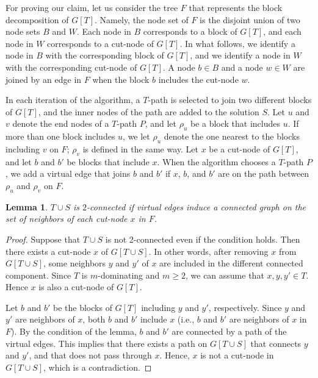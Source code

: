 \documentclass[11pt]{article}
\newtheorem{lemma}{Lemma}
\begin{document}
 For proving our claim, 
  let us consider the tree $F$ that represents the block
  decomposition of $G[T]$.
  Namely, the node set of $F$ is the disjoint union of two node sets $B$
  and $W$. Each node in $B$ corresponds to a block of
  $G[T]$,
  and each node in $W$ corresponds to a cut-node of $G[T]$.
  In what follows, we identify a node in $B$ with the corresponding
  block of $G[T]$, and we identify a node in $W$ with the
  corresponding
  cut-node of $G[T]$.
  A node $b \in B$ and a node $w \in W$ are joined by an edge in $F$
  when the block $b$ includes the cut-node $w$.

  In each iteration of the algorithm, a $T$-path is selected to
  join two different blocks of $G[T]$,
  and the inner nodes of the path are
  added to the solution $S$.
  Let $u$ and $v$ denote the end nodes of a $T$-path $P$, and 
  let $\rho_u$ be a block that includes $u$.
  If more than one block includes $u$, we let $\rho_u$
  denote the one nearest to the blocks including $v$ on $F$;
  $\rho_v$ is defined in the same way.
  Let $x$ be a cut-node of $G[T]$,
  and let $b$ and $b'$ be blocks that include $x$.
  When the algorithm chooses a $T$-path $P$,
  we add a virtual edge 
  that joins
  $b$ and $b'$ 
  if $x$, $b$, and $b'$ are on the path between
  $\rho_u$ and $\rho_v$ on $F$.
  
  \begin{lemma}
   $T\cup S$ is $2$-connected if
   virtual edges induce a connected graph
   on the set of neighbors of
    each cut-node $x$ in $F$.
  \end{lemma}
  \begin{proof}
   Suppose that $T\cup S$ is not 2-connected even if the condition holds. Then there 
   exists a cut-node $x$ of $G[T\cup S]$.
   In other words, after removing $x$ from $G[T\cup S]$, some neighbors $y$ and $y'$ of $x$
   are included in the different connected component.
   Since $T$ is $m$-dominating and $m \geq 2$, we can assume that $x,y,y' \in T$.
   Hence $x$ is also a cut-node of $G[T]$.
      
   Let $b$ and $b'$ be the blocks of $G[T]$ including $y$ and $y'$, respectively. 
   Since $y$ and $y'$ are neighbors of $x$, both $b$ and $b'$ include $x$ (i.e., 
   $b$ and $b'$ are neighbors of $x$ in $F$).
   By the condition of the lemma,
   $b$ and $b'$ are connected by a path of the virtual edges. 
   This implies that there exists a path on $G[T\cup S]$ that connects $y$ and $y'$,
   and that does not pass through $x$.
   Hence, $x$ is not a cut-node in $G[T\cup S]$, which is a contradiction.
  \end{proof}
\end{document}
